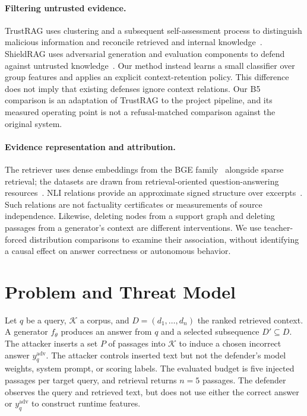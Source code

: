 \documentclass[sigconf]{aamas}
\begin{document}
\paragraph{Filtering untrusted evidence.}
TrustRAG uses clustering and a subsequent self-assessment process to distinguish malicious information and reconcile retrieved and internal knowledge~\cite{trustrag}. ShieldRAG uses adversarial generation and evaluation components to defend against untrusted knowledge~\cite{shieldrag}. Our method instead learns a small classifier over group features and applies an explicit context-retention policy. This difference does not imply that existing defenses ignore context relations. Our B5 comparison is an adaptation of TrustRAG to the project pipeline, and its measured operating point is not a refusal-matched comparison against the original system.

\paragraph{Evidence representation and attribution.}
The retriever uses dense embeddings from the BGE family~\cite{bge} alongside sparse retrieval; the datasets are drawn from retrieval-oriented question-answering resources~\cite{beir}. NLI relations provide an approximate signed structure over excerpts~\cite{nlimodel}. Such relations are not factuality certificates or measurements of source independence. Likewise, deleting nodes from a support graph and deleting passages from a generator's context are different interventions. We use teacher-forced distribution comparisons to examine their association, without identifying a causal effect on answer correctness or autonomous behavior.

\section{Problem and Threat Model}
Let $q$ be a query, $\mathcal{K}$ a corpus, and $D=(d_1,\ldots,d_n)$ the ranked retrieved context. A generator $f_\theta$ produces an answer from $q$ and a selected subsequence $D'\subseteq D$. The attacker inserts a set $P$ of passages into $\mathcal{K}$ to induce a chosen incorrect answer $y^{\mathrm{adv}}_q$. The attacker controls inserted text but not the defender's model weights, system prompt, or scoring labels. The evaluated budget is five injected passages per target query, and retrieval returns $n=5$ passages. The defender observes the query and retrieved text, but does not use either the correct answer or $y^{\mathrm{adv}}_q$ to construct runtime features.
\end{document}
